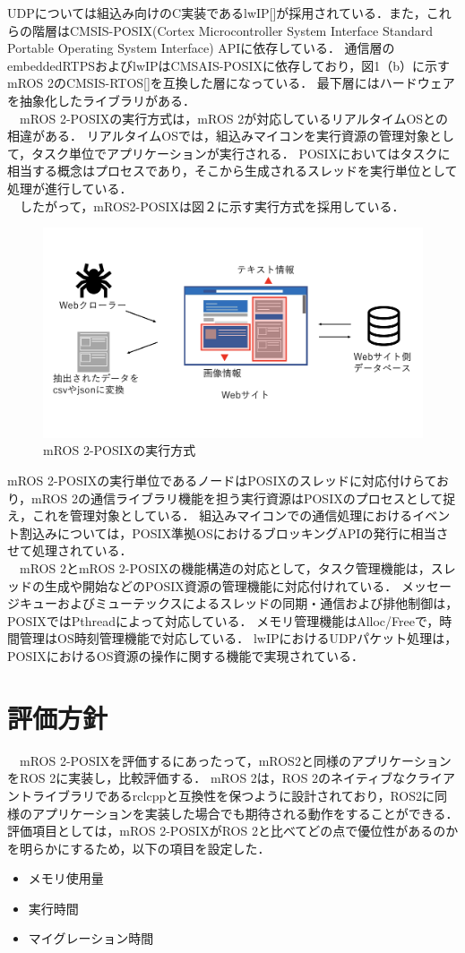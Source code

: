 \documentclass[11pt]{ujarticle}
\begin{document}
UDPについては組込み向けのC実装であるlwIP[]が採用されている．また，これらの階層はCMSIS-POSIX(Cortex Microcontroller System Interface Standard Portable Operating System Interface) APIに依存している．
通信層のembeddedRTPSおよびlwIPはCMSAIS-POSIXに依存しており，図1（b）に示すmROS 2のCMSIS-RTOS[]を互換した層になっている．
最下層にはハードウェアを抽象化したライブラリがある．
\\　mROS 2-POSIXの実行方式は，mROS 2が対応しているリアルタイムOSとの相違がある．
リアルタイムOSでは，組込みマイコンを実行資源の管理対象として，タスク単位でアプリケーションが実行される．
POSIXにおいてはタスクに相当する概念はプロセスであり，そこから生成されるスレッドを実行単位として処理が進行している．
\\　したがって，mROS2-POSIXは図２に示す実行方式を採用している．
\begin{figure}[h]
	\includegraphics[width=0.9\linewidth]{./src/selenium.png}
	\caption{mROS 2-POSIXの実行方式}
  \label{fig:arch}
\end{figure}
mROS 2-POSIXの実行単位であるノードはPOSIXのスレッドに対応付けらており，mROS 2の通信ライブラリ機能を担う実行資源はPOSIXのプロセスとして捉え，これを管理対象としている．
組込みマイコンでの通信処理におけるイベント割込みについては，POSIX準拠OSにおけるブロッキングAPIの発行に相当させて処理されている．
\\　mROS 2とmROS 2-POSIXの機能構造の対応として，タスク管理機能は，スレッドの生成や開始などのPOSIX資源の管理機能に対応付けれている．
メッセージキューおよびミューテックスによるスレッドの同期・通信および排他制御は，POSIXではPthreadによって対応している．
メモリ管理機能はAlloc/Freeで，時間管理はOS時刻管理機能で対応している．
lwIPにおけるUDPパケット処理は，POSIXにおけるOS資源の操作に関する機能で実現されている．


\section{評価方針}
　mROS 2-POSIXを評価するにあったって，mROS2と同様のアプリケーションをROS 2に実装し，比較評価する．
mROS 2は，ROS 2のネイティブなクライアントライブラリであるrclcppと互換性を保つように設計されており，ROS2に同様のアプリケーションを実装した場合でも期待される動作をすることができる．
評価項目としては，mROS 2-POSIXがROS 2と比べてどの点で優位性があるのかを明らかにするため，以下の項目を設定した．
\begin{itemize}
	\item メモリ使用量
	\item 実行時間
	\item マイグレーション時間
\end{itemize}
\end{document}

